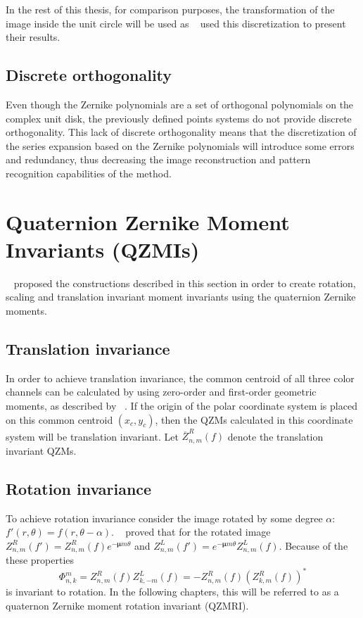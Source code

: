 In the rest of this thesis, for comparison purposes, the transformation of the image inside the unit circle will be used as \citeauthor{qzmi}~\cite{qzmi} used this discretization to present their results.

\subsection{Discrete orthogonality}
Even though the Zernike polynomials are a set of orthogonal polynomials on the complex unit disk, the previously defined points systems do not provide discrete orthogonality. This lack of discrete orthogonality means that the discretization of the series expansion based on the Zernike polynomials will introduce some errors and redundancy, thus decreasing the image reconstruction and pattern recognition capabilities of the method.


\section{Quaternion Zernike Moment Invariants (QZMIs)}\label{sec:invariance}
\citeauthor{qzmi}~\cite{qzm, qzmi} proposed the constructions described in this section in order to create rotation, scaling and translation invariant moment invariants using the quaternion Zernike moments.

\subsection{Translation invariance}
In order to achieve translation invariance, the common centroid of all three color channels can be calculated by using zero-order and first-order geometric moments, as described by \citeauthor{affine_color}~\cite{affine_color}.
If the origin of the polar coordinate system is placed on this common centroid $(x_c, y_c)$, then the QZMs calculated in this coordinate system will be translation invariant. Let $\overline{Z}_{n,m}^R(f)$ denote the translation invariant QZMs.

\subsection{Rotation invariance}
To achieve rotation invariance consider the image rotated by some degree $\alpha$: $f'(r,\theta) = f(r, \theta - \alpha)$. \citeauthor{qzmi}~\cite{qzmi} proved that for the rotated image $Z_{n,m}^R(f') = Z_{n,m}^R(f)e^{-\bm{\mu}m\theta}$ and $Z_{n,m}^L(f') = e^{-\bm{\mu}m\theta}Z_{n,m}^L(f)$. Because of the these properties $$\Phi_{n,k}^m = Z_{n,m}^R(f)Z_{k,-m}^L(f) = -Z_{n,m}^R(f)(Z_{k,m}^R(f))^*$$ is invariant to rotation. In the following chapters, this will be referred to as a quaternon Zernike moment rotation invariant (QZMRI).

